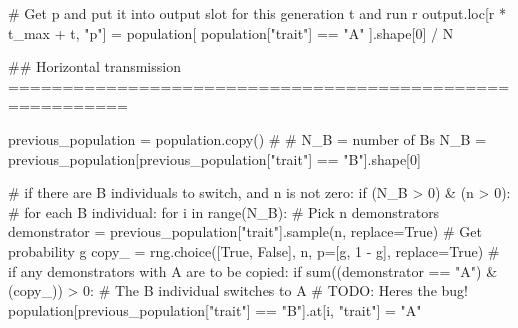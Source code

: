 \documentclass[
  a4paperpaper,
  ,captions=tableheading
]{scrbook}
\newenvironment{Shaded}{\begin{snugshade}}{\end{snugshade}}
\newcommand{\AlertTok}[1]{\textcolor[rgb]{0.68,0.00,0.00}{#1}}
\newcommand{\BuiltInTok}[1]{\textcolor[rgb]{0.00,0.23,0.31}{#1}}
\newcommand{\CommentTok}[1]{\textcolor[rgb]{0.37,0.37,0.37}{#1}}
\newcommand{\ControlFlowTok}[1]{\textcolor[rgb]{0.00,0.23,0.31}{#1}}
\newcommand{\DecValTok}[1]{\textcolor[rgb]{0.68,0.00,0.00}{#1}}
\newcommand{\KeywordTok}[1]{\textcolor[rgb]{0.00,0.23,0.31}{#1}}
\newcommand{\NormalTok}[1]{\textcolor[rgb]{0.00,0.23,0.31}{#1}}
\newcommand{\OperatorTok}[1]{\textcolor[rgb]{0.37,0.37,0.37}{#1}}
\newcommand{\StringTok}[1]{\textcolor[rgb]{0.13,0.47,0.30}{#1}}
\newcommand{\VariableTok}[1]{\textcolor[rgb]{0.07,0.07,0.07}{#1}}
\begin{document}
\begin{Shaded}
\begin{Highlighting}[]
            \CommentTok{\# Get p and put it into output slot for this generation t and run r}
\NormalTok{            output.loc[r }\OperatorTok{*}\NormalTok{ t\_max }\OperatorTok{+}\NormalTok{ t, }\StringTok{"p"}\NormalTok{] }\OperatorTok{=}\NormalTok{ population[ population[}\StringTok{"trait"}\NormalTok{] }\OperatorTok{==} \StringTok{"A"}\NormalTok{ ].shape[}\DecValTok{0}\NormalTok{] }\OperatorTok{/}\NormalTok{ N}

            \CommentTok{\#\# Horizontal transmission =========================================================}

\NormalTok{            previous\_population }\OperatorTok{=}\NormalTok{ population.copy()}
            \CommentTok{\# \# N\_B = number of Bs}
\NormalTok{            N\_B }\OperatorTok{=}\NormalTok{ previous\_population[previous\_population[}\StringTok{"trait"}\NormalTok{] }\OperatorTok{==} \StringTok{"B"}\NormalTok{].shape[}\DecValTok{0}\NormalTok{]}

            \CommentTok{\# if there are B individuals to switch, and n is not zero:}
            \ControlFlowTok{if}\NormalTok{ (N\_B }\OperatorTok{\textgreater{}} \DecValTok{0}\NormalTok{) }\OperatorTok{\&}\NormalTok{ (n }\OperatorTok{\textgreater{}} \DecValTok{0}\NormalTok{):}
                \CommentTok{\# for each B individual:}
                \ControlFlowTok{for}\NormalTok{ i }\KeywordTok{in} \BuiltInTok{range}\NormalTok{(N\_B):}
                    \CommentTok{\# Pick n demonstrators}
\NormalTok{                    demonstrator }\OperatorTok{=}\NormalTok{ previous\_population[}\StringTok{"trait"}\NormalTok{].sample(n, replace}\OperatorTok{=}\VariableTok{True}\NormalTok{)}
                    \CommentTok{\# Get probability g }
\NormalTok{                    copy\_ }\OperatorTok{=}\NormalTok{ rng.choice([}\VariableTok{True}\NormalTok{, }\VariableTok{False}\NormalTok{], n, p}\OperatorTok{=}\NormalTok{[g, }\DecValTok{1} \OperatorTok{{-}}\NormalTok{ g], replace}\OperatorTok{=}\VariableTok{True}\NormalTok{)}
                    \CommentTok{\# if any demonstrators with A are to be copied:}
                    \ControlFlowTok{if} \BuiltInTok{sum}\NormalTok{((demonstrator }\OperatorTok{==} \StringTok{"A"}\NormalTok{) }\OperatorTok{\&}\NormalTok{ (copy\_)) }\OperatorTok{\textgreater{}} \DecValTok{0}\NormalTok{:}
                      \CommentTok{\# The B individual switches to A }
                      \CommentTok{\# }\AlertTok{TODO}\CommentTok{: Here\textquotesingle{}s the bug!}
\NormalTok{                      population[previous\_population[}\StringTok{"trait"}\NormalTok{] }\OperatorTok{==} \StringTok{"B"}\NormalTok{].at[i, }\StringTok{"trait"}\NormalTok{] }\OperatorTok{=} \StringTok{"A"}


\end{Highlighting}
\end{Shaded}
\end{document}
